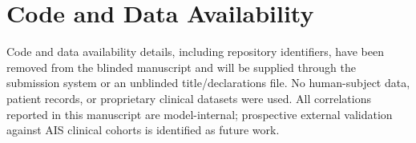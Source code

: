 \section*{Code and Data Availability}

Code and data availability details, including repository identifiers, have been removed from the blinded manuscript and will be supplied through the submission system or an unblinded title/declarations file. No human-subject data, patient records, or proprietary clinical datasets were used. All correlations reported in this manuscript are model-internal; prospective external validation against AIS clinical cohorts is identified as future work.
